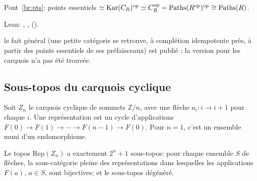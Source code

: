 \begin{trace}
\item[arche] Pont~\ref{br:pts}: points essentiels $\simeq\operatorname{Kar}(C_R)^{\mathrm{op}}\simeq C_R^{\mathrm{op}} = \mathrm{Paths}(R^{\mathrm{op}})^{\mathrm{op}}\cong\mathrm{Paths}(R)$.
\item[vérifier] Lean: , ,  ().
\item[nouveauté] le fait général (une petite catégorie se retrouve, à complétion idempotente près, à partir des points essentiels de ses préfaisceaux) est publié \cite[\S4.2.1]{rogers-thesis}; la version pour les carquois n'a pas été trouvée.
\end{trace}

\subsection{Sous-topos du carquois cyclique}

Soit $Z_n$ le carquois cyclique de sommets $\mathbb Z/n$, avec une flèche $a_i : i\to i+1$ pour chaque $i$. Une représentation est un cycle d'applications $F(0)\to F(1)\to\cdots\to F(n-1)\to F(0)$. Pour $n = 1$, c'est un ensemble muni d'un endomorphisme.

\begin{theorem}\label{th:cycle}
Le topos $\mathrm{Rep}(Z_n)$ a exactement $2^n + 1$ sous-topos: pour chaque ensemble $S$ de flèches, la sous-catégorie pleine des représentations dans lesquelles les applications $F(a)$, $a\in S$, sont bijectives; et le sous-topos dégénéré.
\end{theorem}

